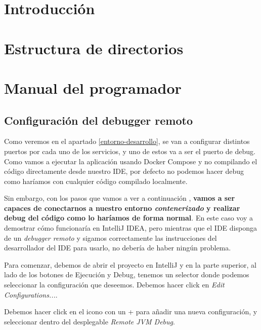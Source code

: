 
\section{Introducción}

\section{Estructura de directorios}

\section{Manual del programador}

\subsection{Configuración del debugger remoto}

Como veremos en el apartado \ref{entorno-desarrollo}, se van a configurar distintos puertos por cada uno de los servicios, y uno de estos va a ser el puerto de debug. Como vamos a ejecutar la aplicación usando Docker Compose y no compilando el código directamente desde nuestro IDE, por defecto no podemos hacer debug como haríamos con cualquier código compilado localmente. 

Sin embargo, con los pasos que vamos a ver a continuación \cite{medium:spring-boot-in-docker}, \textbf{vamos a ser capaces de conectarnos a nuestro entorno \textit{contenerizado} y realizar debug del código como lo haríamos de forma normal}. En este caso voy a demostrar cómo funcionaría en IntelliJ IDEA, pero mientras que el IDE disponga de un \textit{debugger remoto} y sigamos correctamente las instrucciones del desarrollador del IDE para usarlo, no debería de haber ningún problema.


Para comenzar, debemos de abrir  el proyecto en IntelliJ y en la parte superior, al lado de los botones de Ejecución y Debug, tenemos un selector donde podemos seleccionar la configuración que deseemos. Debemos hacer click en \textit{Edit Configurations...}.


Debemos hacer click en el icono con un + para añadir una nueva configuración, y seleccionar dentro del desplegable \textit{Remote JVM Debug}.

